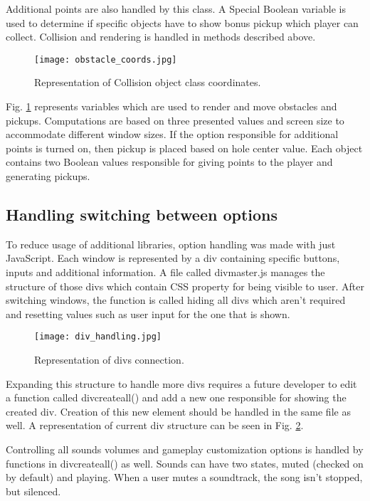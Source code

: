 \documentclass[oneside,a4paper,11pt]{report}
\begin{document}
\par
Additional points are also handled by this class. A Special Boolean variable is used to determine if specific objects have to show bonus pickup which player can collect. Collision and rendering is handled in methods described above.

\begin{figure}
	\centering
	\texttt{[image: obstacle\_coords.jpg]}
	\caption{Representation of Collision object class coordinates.\label{fig:collision}}
\end{figure}
	
\par
Fig. \ref{fig:collision} represents variables which are used to render and move obstacles and pickups. Computations are based on three presented values and screen size to accommodate different window sizes. If the option responsible for additional points is turned on, then pickup is placed based on hole center value. Each object contains two Boolean values responsible for giving points to the player and generating pickups.

\subsection{Handling switching between options}
To reduce usage of additional libraries, option handling was made with just JavaScript. Each window is represented by a div containing specific buttons, inputs and additional information. A file called div\textunderscore master.js manages the structure of those divs which contain CSS property for being visible to user. After switching windows, the function is called hiding all divs which aren’t required and resetting values such as user input for the one that is shown.

\begin{figure}
	\centering
	\texttt{[image: div\_handling.jpg]}
	\caption{Representation of divs connection.\label{fig:div_handling}}
\end{figure}

\par
Expanding this structure to handle more divs requires a future developer to edit a function called div\textunderscore create\textunderscore all() and add a new one responsible for showing the created div. Creation of this new element should be handled in the same file as well. A representation of current div structure can be seen in Fig. \ref{fig:div_handling}.

\par
Controlling all sounds volumes and gameplay customization options is handled by functions in div\textunderscore create\textunderscore all() as well. Sounds can have two states, muted (checked on by default) and playing. When a user mutes a soundtrack, the song isn’t stopped, but silenced.
\end{document}
